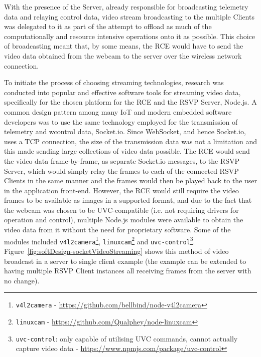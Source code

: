       With the presence of the Server, already responsible for broadcasting telemetry data and relaying control data, video stream broadcasting to the multiple Clients was delegated to it as part of the attempt to offload as much of the computationally and resource intensive operations onto it as possible. This choice of broadcasting meant that, by some means, the RCE would have to send the video data obtained from the webcam to the server over the wireless network connection.
      
      To initiate the process of choosing streaming technologies, research was conducted into popular and effective software tools for streaming video data, specifically for the chosen platform for the RCE and the RSVP Server, Node.js. A common design pattern among many IoT and modern embedded software developers was to use the same technology employed for the transmission of telemetry and wcontrol data, Socket.io. Since WebSocket, and hence Socket.io, uses a TCP connection, the size of the transmission data was not a limitation and this made sending large collections of video data possible. The RCE would send the video data frame-by-frame, as separate Socket.io messages, to the RSVP Server, which would simply relay the frames to each of the connected RSVP Clients in the same manner and the frames would then be played back to the user in the application front-end. However, the RCE would still require the video frames to be available as images in a supported format, and due to the fact that the webcam was chosen to be UVC-compatible (i.e. not requiring drivers for operation and control), multiple Node.js modules were available to obtain the video data from it without the need for proprietary software. Some of the modules included \texttt{v4l2camera}\footnote{\texttt{v4l2camera} - \url{https://github.com/bellbind/node-v4l2camera}}, \texttt{linuxcam}\footnote{\texttt{linuxcam} - \url{https://github.com/Qualphey/node-linuxcam}} and \texttt{uvc-control}\footnote{\texttt{uvc-control}: only capable of utilising UVC commands, cannot actually capture video data - \url{https://www.npmjs.com/package/uvc-control}}. Figure~\ref{fig:softDesign-socketVideoStreaming} shows this method of video broadcast in a server to single client example (the example can be extended to having multiple RSVP Client instances all receiving frames from the server with no change).
      
